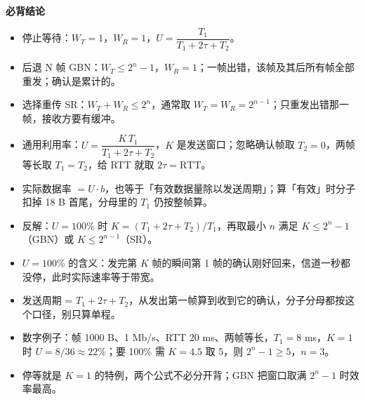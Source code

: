 \documentclass[10pt,a4paper]{ctexart}
\begin{document}



\textbf{必背结论}

\begin{itemize}

\item 停止等待：$W_T = 1$，$W_R = 1$，$U = \dfrac{T_1}{T_1 + 2\tau + T_2}$。

\item 后退 N 帧 GBN：$W_T \le 2^{n} - 1$，$W_R = 1$；一帧出错，该帧及其后所有帧全部重发；确认是累计的。

\item 选择重传 SR：$W_T + W_R \le 2^{n}$，通常取 $W_T = W_R = 2^{n-1}$；只重发出错那一帧，接收方要有缓冲。

\item 通用利用率：$U = \dfrac{K\,T_1}{T_1 + 2\tau + T_2}$，$K$ 是发送窗口；忽略确认帧取 $T_2 = 0$，两帧等长取 $T_1 = T_2$，给 RTT 就取 $2\tau = \text{RTT}$。

\item 实际数据率 $= U \cdot b$，也等于「有效数据量除以发送周期」；算「有效」时分子扣掉 18 B 首尾，分母里的 $T_1$ 仍按整帧算。

\item 反解：$U = 100\%$ 时 $K = (T_1 + 2\tau + T_2)/T_1$，再取最小 $n$ 满足 $K \le 2^{n} - 1$（GBN）或 $K \le 2^{n-1}$（SR）。

\item $U = 100\%$ 的含义：发完第 $K$ 帧的瞬间第 1 帧的确认刚好回来，信道一秒都没停，此时实际速率等于带宽。

\item 发送周期 = $T_1 + 2\tau + T_2$，从发出第一帧算到收到它的确认，分子分母都按这个口径，别只算单程。

\item 数字例子：帧 1000 B、1 Mb/s、RTT 20 ms、两帧等长，$T_1 = 8$ ms，$K = 1$ 时 $U = 8/36 \approx 22\%$；要 100\% 需 $K = 4.5$ 取 5，则 $2^{n}-1 \ge 5$，$n = 3$。

\item 停等就是 $K = 1$ 的特例，两个公式不必分开背；GBN 把窗口取满 $2^{n}-1$ 时效率最高。

\end{itemize}
\end{document}
